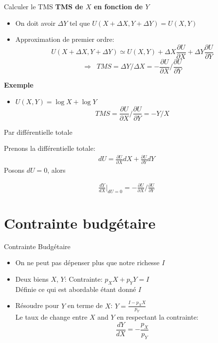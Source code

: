 \documentclass[handout]{beamer}
\begin{document}
\begin{frame}{Calculer le TMS}
\textbf{TMS de $X$ en fonction de $Y$} \pause
\begin{itemize}
\item On doit avoir $\Delta Y$ tel que $U(X + \Delta X, Y + \Delta Y) = U(X,Y)$
\item Approximation de premier ordre: $$U(X+\Delta X, Y+ \Delta Y) \simeq  U(X,Y)+  \Delta X  \frac{\partial U}{\partial X} + \Delta Y \frac{\partial U}{\partial Y}$$\pause
$$ \Rightarrow \;\; TMS = \Delta Y/ \Delta X =  -\frac{\partial U}{\partial X}/ \frac{\partial U}{\partial Y}$$
\end{itemize}

\textbf{Exemple}
\begin{itemize}
\item $U(X,Y) = \log X + \log Y$
 $$TMS = \frac{\partial U}{\partial X}/ \frac{\partial U}{\partial Y} = -Y/X$$
\end{itemize}

\end{frame}

\begin{frame}{Par différentielle totale}

Prenons la différentielle totale:
\begin{align}
dU = \frac{\partial U}{\partial X}dX + \frac{\partial U}{\partial Y}dY
\end{align}
Posons $dU = 0$, alors 

\begin{align}
\frac{dY}{dX}\bigg\rvert_{dU=0} = -\frac{\partial U}{\partial X}/ \frac{\partial U}{\partial Y}
\end{align}

\end{frame}


\section{Contrainte budgétaire}

\begin{frame}{Contrainte Budgétaire}
\begin{itemize}
\item On ne peut pas dépenser plus que notre richesse $I$
\item Deux biens $X$, $Y$:  Contrainte: $p_X X + p_Y Y = I$ \\ Définie ce qui est abordable étant donné $I$\\
\item Résoudre pour $Y$ en terme de  $X$:     $Y = \frac{I - p_X X}{p_Y}$\\
Le taux de change entre $X$ and $Y$ en respectant la contrainte: $$\frac{dY}{dX} = -\frac{p_X}{p_Y}$$
\end{itemize}

\end{frame}
\end{document}
